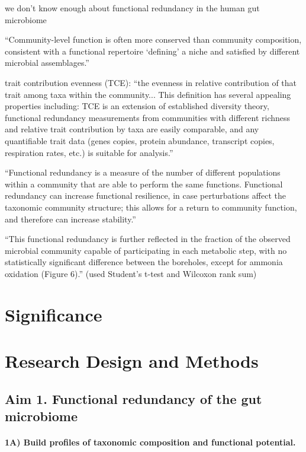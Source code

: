 \documentclass[11pt]{article}
\begin{document}
we don't know enough about functional redundancy in the human gut microbiome \cite{heintz-buschart_human_2018}

``Community-level function is often more conserved than community composition, consistent with a functional repertoire ‘defining’ a niche and satisfied by different microbial assemblages.'' \cite{franzosa_species-level_2018}




trait contribution evenness (TCE): ``the evenness in relative contribution of that trait among taxa within the community... This definition has several appealing properties including: TCE is an extension of established diversity theory, functional redundancy measurements from communities with different richness and relative trait contribution by taxa are easily comparable, and any quantifiable trait data (genes copies, protein abundance, transcript copies, respiration rates, etc.) is suitable for analysis.'' \cite{royalty_quantitative_2020}

``Functional redundancy is a measure of the number of different populations within a community that are able to perform the same functions. Functional redundancy can increase functional resilience, in case perturbations affect the taxonomic community structure; this allows for a return to community function, and therefore can increase stability.'' \cite{heintz-buschart_human_2018}

``This functional redundancy is further reflected in the fraction of the observed microbial community capable of participating in each metabolic step, with no statistically significant difference between the boreholes, except for ammonia oxidation (Figure 6).'' (used Student's t-test and Wilcoxon rank sum) \cite{tully_dynamic_2018}


\section*{Significance} %


\section*{Research Design and Methods}

\subsection*{Aim 1. Functional redundancy of the gut microbiome}

\paragraph{1A) Build profiles of taxonomic composition and functional potential.}
\end{document}
